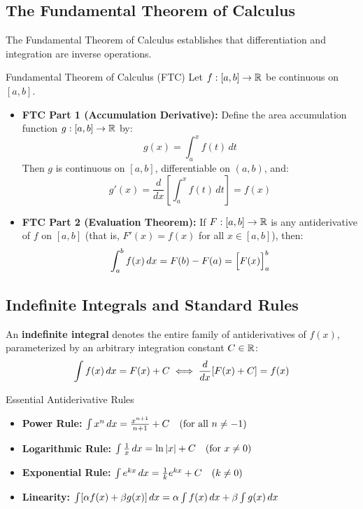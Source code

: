 \subsection{The Fundamental Theorem of Calculus}

The Fundamental Theorem of Calculus establishes that differentiation and integration are inverse operations.

\begin{theorembox}{Fundamental Theorem of Calculus (FTC)}
Let $f: [a, b] \to \mathbb{R}$ be continuous on $[a, b]$.
\begin{itemize}
    \item \textbf{FTC Part 1 (Accumulation Derivative):} Define the area accumulation function $g: [a, b] \to \mathbb{R}$ by:
    \begin{equation}
    g(x) = \int_a^x f(t) \, dt
    \end{equation}
    Then $g$ is continuous on $[a, b]$, differentiable on $(a, b)$, and:
    \begin{equation}
    g'(x) = \frac{d}{dx} \left[ \int_a^x f(t) \, dt \right] = f(x)
    \end{equation}
    \item \textbf{FTC Part 2 (Evaluation Theorem):} If $F: [a, b] \to \mathbb{R}$ is any antiderivative of $f$ on $[a, b]$ (that is, $F'(x) = f(x)$ for all $x \in [a, b]$), then:
    \begin{equation}
    \int_a^b f(x) \,dx = F(b) - F(a) = \Big[ F(x) \Big]_a^b
    \end{equation}
\end{itemize}
\end{theorembox}

\subsection{Indefinite Integrals and Standard Rules}

An \textbf{indefinite integral} denotes the entire family of antiderivatives of $f(x)$, parameterized by an arbitrary integration constant $C \in \mathbb{R}$:
\begin{equation}
\int f(x) \,dx = F(x) + C \iff \frac{d}{dx}[F(x) + C] = f(x)
\end{equation}

\begin{formulabox}{Essential Antiderivative Rules}
\begin{itemize}
    \item \textbf{Power Rule:} $\int x^n \,dx = \frac{x^{n+1}}{n+1} + C \quad (\text{for all } n \neq -1)$
    \item \textbf{Logarithmic Rule:} $\int \frac{1}{x} \,dx = \ln|x| + C \quad (\text{for } x \neq 0)$
    \item \textbf{Exponential Rule:} $\int e^{kx} \,dx = \frac{1}{k}e^{kx} + C \quad (k \neq 0)$
    \item \textbf{Linearity:} $\int [\alpha f(x) + \beta g(x)] \,dx = \alpha \int f(x) \,dx + \beta \int g(x) \,dx$
\end{itemize}
\end{formulabox}

